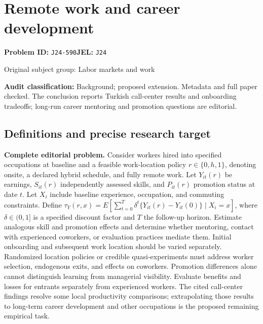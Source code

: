 \documentclass[11pt,a4paper]{article}
\begin{document}
\section*{Remote work and career development}
\textbf{Problem ID:} \texttt{J24-590}\quad \textbf{JEL:} \texttt{J24}\par
\label{problem:OP-0358}
{\sffamily\small\color{muted}Original subject group: Labor markets and work\par}
\label{definitions:problem:30007640}
\textbf{Audit classification:} Background; proposed extension. Metadata and full paper checked. The conclusion reports Turkish call-center results and onboarding tradeoffs; long-run career mentoring and promotion questions are editorial.
\subsection*{Definitions and precise research target}
\textbf{Complete editorial problem.} Consider workers hired into specified occupations at baseline and a feasible work-location policy \(r\in\{0,h,1\}\), denoting onsite, a declared hybrid schedule, and fully remote work. Let \(Y_{it}(r)\) be earnings, \(S_{it}(r)\) independently assessed skills, and \(P_{it}(r)\) promotion status at date \(t\). Let \(X_i\) include baseline experience, occupation, and commuting constraints. Define \(\tau_Y(r,x)=E[\sum_{t=0}^{T}\delta^t\{Y_{it}(r)-Y_{it}(0)\}\mid X_i=x]\), where \(\delta\in(0,1]\) is a specified discount factor and \(T\) the follow-up horizon. Estimate analogous skill and promotion effects and determine whether mentoring, contact with experienced coworkers, or evaluation practices mediate them. Initial onboarding and subsequent work location should be varied separately. Randomized location policies or credible quasi-experiments must address worker selection, endogenous exits, and effects on coworkers. Promotion differences alone cannot distinguish learning from managerial visibility. Evaluate benefits and losses for entrants separately from experienced workers. The cited call-center findings resolve some local productivity comparisons; extrapolating those results to long-term career development and other occupations is the proposed remaining empirical task.
\end{document}

